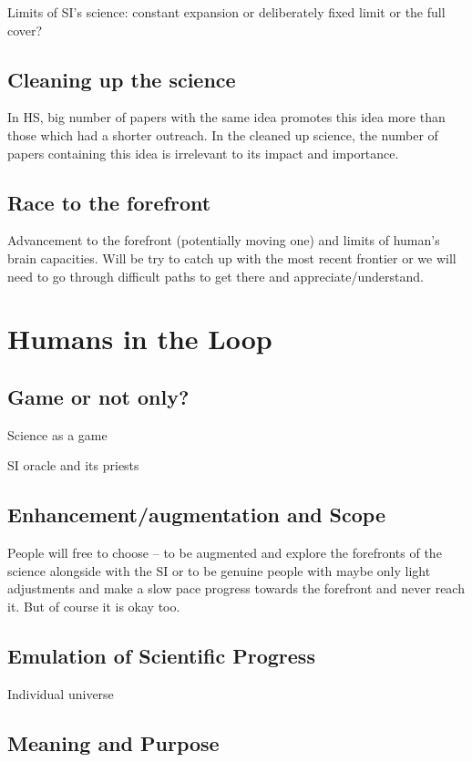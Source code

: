 \documentclass[a4paper,11pt]{article}
\begin{document}
        Limits of SI's science: constant expansion or deliberately fixed limit or the full cover?

        \subsection{Cleaning up the science}

        In HS, big number of papers with the same idea promotes this idea more than those which had a shorter outreach. In the cleaned up science, the number of papers containing this idea is irrelevant to its impact and importance. 

        \subsection{Race to the forefront}

        Advancement to the forefront (potentially moving one) and limits of human's brain capacities. Will be try to catch up with the most recent frontier or we will need to go through difficult paths to get there and appreciate/understand.

    \section{Humans in the Loop}

        \subsection{Game or not only?}

        Science as a game

        SI oracle and its priests

        \subsection{Enhancement/augmentation and Scope}






        People will free to choose -- to be augmented and explore the forefronts of the science alongside with the SI or to be genuine people with maybe only light adjustments and make a slow pace progress towards the forefront and never reach it. But of course it is okay too.

        \subsection{Emulation of Scientific Progress}

        Individual universe

        \subsection{Meaning and Purpose}






\printbibliography
\end{document}
